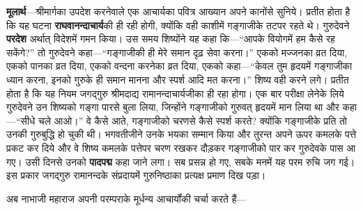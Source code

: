 \begin{sloppypar}\justifying{}
\textbf{मूलार्थ}—श्रीमार्गका उपदेश करनेवाले एक आचार्यका पवित्र आख्यान अपने कानोंसे सुनिये। प्रतीत होता है कि यह घटना \textbf{राघवानन्दाचार्य}की ही रही होगी, क्योंकि वही काशीमें गङ्गाजीके तटपर रहते थे। गुरुदेवने \textbf{परदेश} अर्थात् विदेशमें गमन किया। उस समय शिष्योंने यह कहा कि—“आपके वियोगमें हम कैसे रह सकेंगे?” तो गुरुदेवने कहा—“गङ्गाजीकी ही मेरे समान दृढ़ सेवा करना।” एकको मज्जनका व्रत दिया, एकको पानका व्रत दिया, एकको वन्दना करनेका व्रत दिया, एकको कहा—“केवल तुम हृदयमें गङ्गाजीका ध्यान करना, इनको गुरुके ही समान मानना और स्पर्श आदि मत करना।” शिष्य वही करने लगे। प्रतीत होता है कि यह नियम जगद्गुरु श्रीमदाद्य रामानन्दाचार्यजीका ही रहा होगा। एक बार परीक्षा लेनेके लिये गुरुदेवने उन शिष्यको गङ्गा पारसे बुला लिया, जिन्होंने गङ्गाजीको गुरुवत् हृदयमें मान लिया था और कहा—“सीधे चले आओ।” वे कैसे आते, गङ्गाजीको चरणसे कैसे स्पर्श करते? क्योंकि गङ्गाजीके प्रति तो उनकी गुरुबुद्धि हो चुकी थी। भगवतीजीने उनके भयका सम्मान किया और तुरन्त अपने ऊपर कमलके पत्ते प्रकट कर दिये और वे शिष्य कमलके पत्तेपर चरण रखकर दौड़कर गङ्गाजीको पार कर गुरुदेवके पास आ गए। उसी दिनसे उनको \textbf{पादपद्म} कहा जाने लगा। सब प्रसन्न हो गए, सबके मनमें यह परम रुचि जग गई। इस प्रकार जगद्गुरु रामानन्दके संप्रदायमें गुरुनिष्ठाका प्रत्यक्ष प्रमाण दिख पड़ा।
\end{sloppypar}
\begin{sloppypar}\justifying{}
अब नाभाजी महाराज अपनी परम्पराके मूर्धन्य आचार्योंकी चर्चा करते हैं—
\end{sloppypar}


